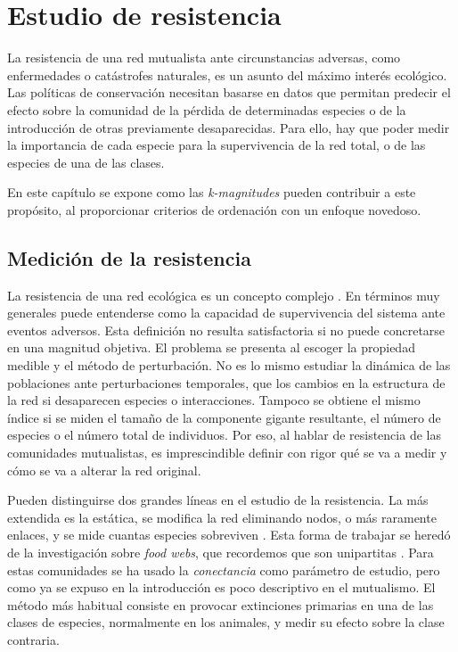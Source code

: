 
\chapter{Estudio de resistencia} %
\label{ChapterDESTRUCCION}  %

La resistencia de una red mutualista ante circunstancias adversas, como enfermedades o catástrofes naturales, es un asunto del máximo interés ecológico. Las políticas de conservación necesitan basarse en datos que permitan predecir el efecto sobre la comunidad de la pérdida de determinadas especies o de la introducción de otras previamente desaparecidas. Para ello, hay que poder medir la importancia de cada especie para la supervivencia de la red total, o de las especies de una de las clases.

En este capítulo se expone como las \textit{k-magnitudes} pueden contribuir a este propósito, al proporcionar criterios de ordenación con un enfoque novedoso.


\section{Medición de la resistencia}

La resistencia de una red ecológica es un concepto complejo \cite{arnoldi2016resilience}. En términos muy generales puede entenderse como la capacidad de supervivencia del sistema ante eventos adversos. Esta definición no resulta satisfactoria si no puede concretarse en una magnitud objetiva. El problema se presenta al escoger la propiedad medible y el método de perturbación. No es lo mismo estudiar la dinámica de las poblaciones ante perturbaciones temporales, que los cambios en la estructura de la red si desaparecen especies o interacciones. Tampoco se obtiene el mismo índice si se miden el tamaño de la componente gigante resultante, el número de especies o el número total de individuos. Por eso, al hablar de resistencia de las comunidades mutualistas, es imprescindible definir con rigor qué se va a medir y cómo se va a alterar la red original.

Pueden distinguirse dos grandes líneas en el estudio de la resistencia. La más extendida es la estática, se modifica la red eliminando nodos, o más raramente enlaces, y se mide cuantas especies sobreviven \cite{memmott2004tolerance, ebenman2005using, kaiser2010robustness}. Esta forma de trabajar se heredó de la investigación sobre \textit{food webs}, que recordemos que son unipartitas \cite{dunne2002biodiversity, dunne2009cascading}. Para estas comunidades se ha usado la \textit{conectancia} como parámetro de estudio, pero como ya se expuso en la introducción es poco descriptivo en el mutualismo.
El método más habitual consiste en provocar extinciones primarias en una de las clases de especies, normalmente en los animales, y medir su efecto sobre la clase contraria.

